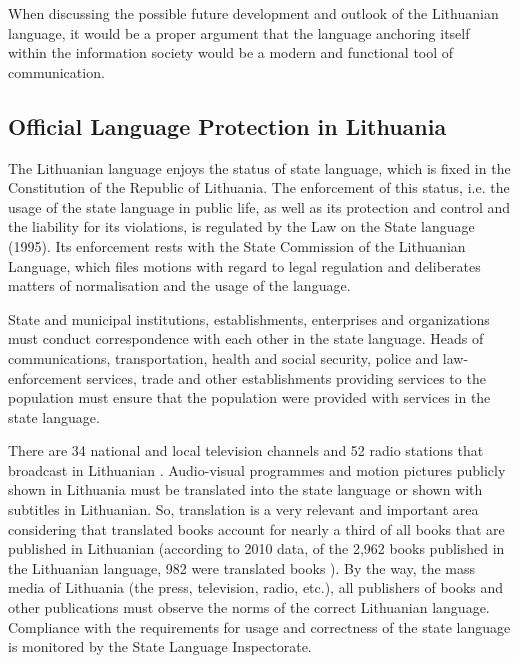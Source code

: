 \documentclass[]{../metanetpaper}
\begin{document}
\begin{multicols}{2}
When discussing the possible future development and outlook of the Lithuanian language, it would be a proper argument that the language anchoring itself within the information society would be a modern and functional tool of communication.

\subsection{Official Language Protection in Lithuania}

The Lithuanian language enjoys the status of state language, which is fixed in the Constitution of the Republic of Lithuania. The enforcement of this status, i.e. the usage of the state language in public life, as well as its protection and control and the liability for its violations, is regulated by the Law on the State language (1995). Its enforcement rests with the State Commission of the Lithuanian Language, which files motions with regard to legal regulation and deliberates matters of normalisation and the usage of the language. 

    State and municipal institutions, establishments, enterprises and organizations must conduct correspondence with each other in the state language. Heads of communications, transportation, health and social security, police and law-enforcement services, trade and other establishments providing services to the population must ensure that the population were provided with services in the state language. 


There are 34 national and local television channels and 52 radio stations that broadcast in Lithuanian \cite{ldrt}. Audio-visual programmes and motion pictures publicly shown in Lithuania must be translated into the state language or shown with subtitles in Lithuanian. So, translation is a very relevant and important area considering that translated books account for nearly a third of all books that are published in Lithuanian (according to 2010 data, of the 2,962 books published in the Lithuanian language, 982 were translated books \cite{bbsc}).  By the way, the mass media of Lithuania (the press, television, radio, etc.), all publishers of books and other publications must observe the norms of the correct Lithuanian language. Compliance with the requirements for usage and correctness of the state language is monitored by the State Language Inspectorate.


\end{multicols}
\end{document}
